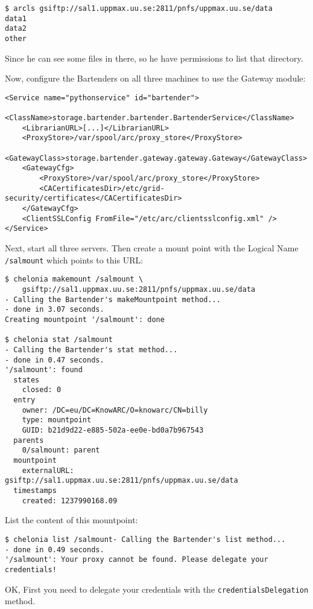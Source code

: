 \documentclass{article}
\begin{document}
\begin{verbatim}
$ arcls gsiftp://sal1.uppmax.uu.se:2811/pnfs/uppmax.uu.se/data
data1
data2
other
\end{verbatim}

Since he can see some files in there, so he have permissions to list that directory.

Now, configure the Bartenders on all three machines to use the Gateway module:

\begin{verbatim}
<Service name="pythonservice" id="bartender">
    <ClassName>storage.bartender.bartender.BartenderService</ClassName>
    <LibrarianURL>[...]</LibrarianURL>
    <ProxyStore>/var/spool/arc/proxy_store</ProxyStore>
    <GatewayClass>storage.bartender.gateway.gateway.Gateway</GatewayClass>
    <GatewayCfg>
        <ProxyStore>/var/spool/arc/proxy_store</ProxyStore>
        <CACertificatesDir>/etc/grid-security/certificates</CACertificatesDir>
    </GatewayCfg>
    <ClientSSLConfig FromFile="/etc/arc/clientsslconfig.xml" />
</Service>
\end{verbatim}

Next, start all three servers. Then create a mount point with the Logical Name \verb!/salmount! which points to this URL:

\begin{verbatim}
$ chelonia makemount /salmount \
    gsiftp://sal1.uppmax.uu.se:2811/pnfs/uppmax.uu.se/data
- Calling the Bartender's makeMountpoint method...
- done in 3.07 seconds.
Creating mountpoint '/salmount': done

$ chelonia stat /salmount
- Calling the Bartender's stat method...
- done in 0.47 seconds.
'/salmount': found
  states
    closed: 0
  entry
    owner: /DC=eu/DC=KnowARC/O=knowarc/CN=billy
    type: mountpoint
    GUID: b21d9d22-e885-502a-ee0e-bd0a7b967543
  parents
    0/salmount: parent
  mountpoint
    externalURL: gsiftp://sal1.uppmax.uu.se:2811/pnfs/uppmax.uu.se/data
  timestamps
    created: 1237990168.09
\end{verbatim}

List the content of this mountpoint:

\begin{verbatim}
$ chelonia list /salmount- Calling the Bartender's list method...
- done in 0.49 seconds.
'/salmount': Your proxy cannot be found. Please delegate your credentials!
\end{verbatim}

OK, First you need to delegate your credentials with the \verb!credentialsDelegation! method.
\end{document}
